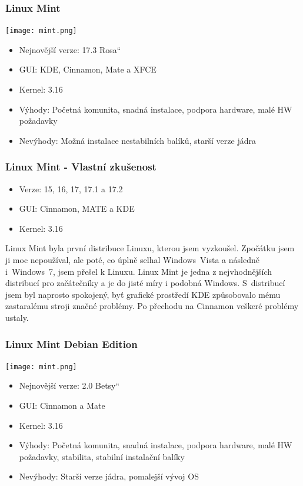 \documentclass{beamer}
\newcommand{\czuv}[1]{\quotedblbase #1\textquotedblleft}
\begin{document}
  \begin{frame}
    \frametitle{Linux Mint}
    \texttt{[image: mint.png]}
      \begin{itemize}
	\item Nejnovější verze: 17.3 \czuv{Rosa}
	\item GUI: KDE, Cinnamon, Mate a XFCE
	\item Kernel: 3.16
	\item Výhody: Početná komunita, snadná instalace, podpora hardware, malé HW požadavky
	\item Nevýhody: Možná instalace nestabilních balíků, starší verze jádra
      \end{itemize}
  \end{frame}
  \begin{frame}
    \frametitle{Linux Mint - Vlastní zkušenost}
      \begin{itemize}
	\item Verze: 15, 16, 17, 17.1 a 17.2
	\item GUI: Cinnamon, MATE a KDE
	\item Kernel: 3.16
      \end{itemize}
      Linux Mint byla první distribuce Linuxu, kterou jsem vyzkoušel. Zpočátku jsem ji moc nepoužíval,
      ale poté, co úplně selhal Windows~Vista a následně i~Windows~7, jsem přešel k
      Linuxu. Linux Mint je jedna z nejvhodnějších distribucí pro začátečníky a
      je do jisté míry i podobná Windows. S~distribucí jsem byl naprosto spokojený,
      byť grafické prostředí KDE způsobovalo mému zastaralému stroji značné problémy.
      Po přechodu na Cinnamon veškeré problémy ustaly.
  \end{frame}
  \begin{frame}
    \frametitle{Linux Mint Debian Edition}
    \texttt{[image: mint.png]}
      \begin{itemize}
	\item Nejnovější verze: 2.0 \czuv{Betsy}
	\item GUI: Cinnamon a Mate
	\item Kernel: 3.16
	\item Výhody: Početná komunita, snadná instalace, podpora hardware, malé HW požadavky, stabilita, stabilní instalační balíky
	\item Nevýhody: Starší verze jádra, pomalejší vývoj OS
      \end{itemize}
  \end{frame}
\end{document}
